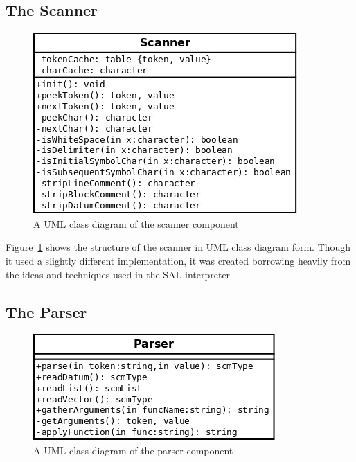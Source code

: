 \subsection{The Scanner}

\begin{figure}
\centering
\includegraphics[width=\textwidth]{scannerUML.png}
\caption{A UML class diagram of the scanner component}
\label{fig:scannerUML}
\end{figure}

Figure~\ref{fig:scannerUML} shows the structure of the scanner in UML class
diagram form. Though it used a slightly different implementation, it was created
borrowing heavily from the ideas and techniques used in the SAL
interpreter~\cite{sal}

\subsection{The Parser}

\begin{figure}
\centering
\includegraphics[width=\textwidth]{parserUML.png}
\caption{A UML class diagram of the parser component}
\label{fig:parserUML}
\end{figure}

